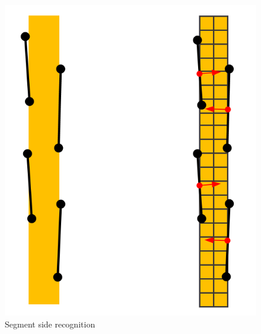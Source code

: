 \documentclass{article}
\begin{document}
\begin{figure}[ht]
  \label{fig:lane_segment}
  \centering
  \includegraphics[scale=0.4]{graphs/segment.PNG}
  \caption{Segment side recognition}
\end{figure}
\FloatBarrier
\end{document}

